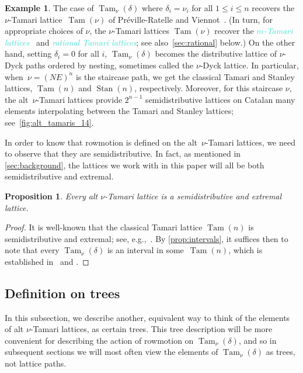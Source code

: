 \documentclass[11pt]{amsart}
\newcommand{\Tam}[1]{\operatorname{Tam}({#1})}
\newcommand{\altTam}[2]{\operatorname{Tam}_{#1}(#2)}
\newcommand{\Stan}[1]{\operatorname{Stan}({#1})}
\newcommand{\dfn}[1]{\textcolor{Turquoise}{\emph{#1}}}
\newtheorem{proposition}[theorem]{Proposition}
\theoremstyle{definition}
\newtheorem{example}[theorem]{Example}
\begin{document}
\begin{example}
The case of $\altTam{\nu}{\delta}$ where $\delta_i = \nu_i$ for all $1 \leq i \leq n$ recovers the $\nu$-Tamari lattice~$\Tam{\nu}$ of Pr\'eville-Ratelle and Viennot~\cite{preville2017nutamari}. (In turn, for appropriate choices of $\nu$, the $\nu$-Tamari lattices $\Tam{\nu}$ recover the \dfn{$m$-Tamari lattices}~\cite{bergeron2012higher} and \dfn{rational Tamari lattices}; see also~\cref{sec:rational} below.) On the other hand, setting $\delta_i = 0$ for all $i$, $\altTam{\nu}{\delta}$ becomes the distributive lattice of $\nu$-Dyck paths ordered by nesting, sometimes called the $\nu$-Dyck lattice. In particular, when~$\nu=(NE)^n$ is the staircase path, we get the classical Tamari and Stanley lattices, $\Tam{n}$ and $\Stan{n}$, respectively. Moreover, for this staircase $\nu$, the alt~$\nu$-Tamari lattices provide $2^{n-1}$ semidistributive lattices on Catalan many elements interpolating between the Tamari and Stanley lattices; see~\cref{fig:alt_tamaris_14}.
\end{example}

In order to know that rowmotion is defined on the alt~$\nu$-Tamari lattices, we need to observe that they are semidistributive. In fact, as mentioned in \cref{sec:background}, the lattices we work with in this paper will all be both semidistributive and extremal.

\begin{proposition} \label{prop:alt_semi_ext}
Every alt $\nu$-Tamari lattice is a semidistributive and extremal lattice.
\end{proposition}

\begin{proof}
It is well-known that the classical Tamari lattice $\Tam{n}$ is semidistributive and extremal; see, e.g.,~\cite{markowsky1992primes}. By \cref{prop:intervals}, it suffices then to note that every $\altTam{\nu}{\delta}$ is an interval in some~$\Tam{n}$, which is established in~\cite{ceballos2024altnu} and \cite{preville2017nutamari}.
\end{proof}

\subsection{Definition on trees} \label{sec:alt_nu_trees}

In this subsection, we describe another, equivalent way to think of the elements of alt $\nu$-Tamari lattices, as certain trees. This tree description will be more convenient for describing the action of rowmotion on $\altTam{\nu}{\delta}$, and so in subsequent sections we will most often view the elements of $\altTam{\nu}{\delta}$ as trees, not lattice paths.
\end{document}
